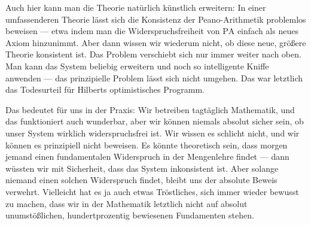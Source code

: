 \begin{spoken-clean}[01:03:50 - 01:06:50]
Auch hier kann man die Theorie natürlich künstlich erweitern: In einer umfassenderen Theorie lässt sich die Konsistenz der Peano-Arithmetik problemlos beweisen --- etwa indem man die Widerspruchsfreiheit von $\text{PA}$ einfach als neues Axiom hinzunimmt. Aber dann wissen wir wiederum nicht, ob diese neue, größere Theorie konsistent ist. Das Problem verschiebt sich nur immer weiter nach oben. Man kann das System beliebig erweitern und noch so intelligente Kniffe anwenden --- das prinzipielle Problem lässt sich nicht umgehen. Das war letztlich das Todesurteil für Hilberts optimistisches Programm.

Das bedeutet für uns in der Praxis: Wir betreiben tagtäglich Mathematik, und das funktioniert auch wunderbar, aber wir können niemals absolut sicher sein, ob unser System wirklich widerspruchsfrei ist. Wir wissen es schlicht nicht, und wir können es prinzipiell nicht beweisen. Es könnte theoretisch sein, dass morgen jemand einen fundamentalen Widerspruch in der Mengenlehre findet --- dann wüssten wir mit Sicherheit, dass das System inkonsistent ist. Aber solange niemand einen solchen Widerspruch findet, bleibt uns der absolute Beweis verwehrt. Vielleicht hat es ja auch etwas Tröstliches, sich immer wieder bewusst zu machen, dass wir in der Mathematik letztlich nicht auf absolut unumstößlichen, hundertprozentig bewiesenen Fundamenten stehen.
\end{spoken-clean}

